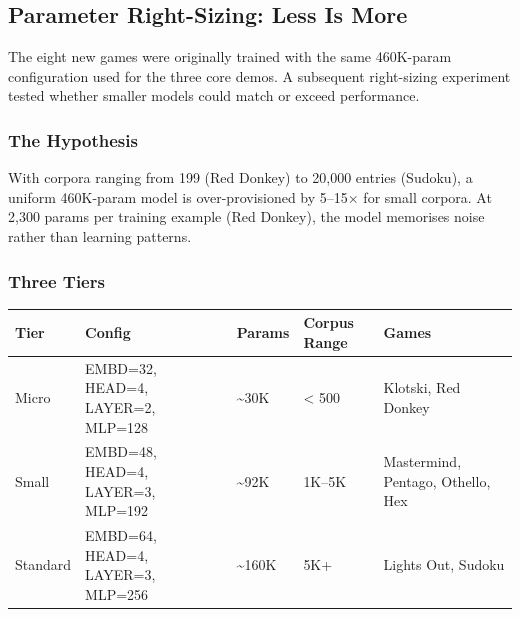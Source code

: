 \documentclass[
]{article}
\begin{document}
\subsection{Parameter Right-Sizing: Less Is
More}\label{parameter-right-sizing-less-is-more}

The eight new games were originally trained with the same 460K-param
configuration used for the three core demos. A subsequent right-sizing
experiment tested whether smaller models could match or exceed
performance.

\subsubsection{The Hypothesis}\label{the-hypothesis}

With corpora ranging from 199 (Red Donkey) to 20,000 entries (Sudoku), a
uniform 460K-param model is over-provisioned by 5--15× for small
corpora. At 2,300 params per training example (Red Donkey), the model
memorises noise rather than learning patterns.

\subsubsection{Three Tiers}\label{three-tiers}

\begin{longtable}[]{@{}
  >{\raggedright\arraybackslash}p{}
  >{\raggedright\arraybackslash}p{}
  >{\raggedleft\arraybackslash}p{}
  >{\raggedright\arraybackslash}p{}
  >{\raggedright\arraybackslash}p{}@{}}
\toprule\noalign{}
\begin{minipage}[b]{\linewidth}\raggedright
Tier
\end{minipage} & \begin{minipage}[b]{\linewidth}\raggedright
Config
\end{minipage} & \begin{minipage}[b]{\linewidth}\raggedleft
Params
\end{minipage} & \begin{minipage}[b]{\linewidth}\raggedright
Corpus Range
\end{minipage} & \begin{minipage}[b]{\linewidth}\raggedright
Games
\end{minipage} \\
\midrule\noalign{}
\endhead
\bottomrule\noalign{}
\endlastfoot
Micro & EMBD=32, HEAD=4, LAYER=2, MLP=128 & \textasciitilde30K &
\textless{} 500 & Klotski, Red Donkey \\
Small & EMBD=48, HEAD=4, LAYER=3, MLP=192 & \textasciitilde92K & 1K--5K
& Mastermind, Pentago, Othello, Hex \\
Standard & EMBD=64, HEAD=4, LAYER=3, MLP=256 & \textasciitilde160K & 5K+
& Lights Out, Sudoku \\
\end{longtable}
\end{document}

